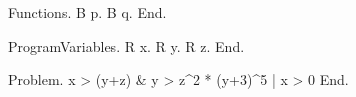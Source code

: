 Functions.
B p.
B q.
End.



ProgramVariables.
R x.
R y.
R z.
End.



Problem.
  x > (y+z) & y > z^2 * (y+3)^5 | x > 0
End.
